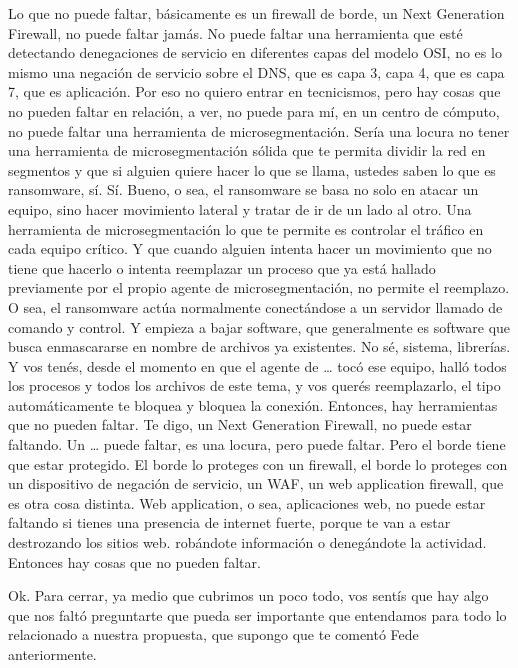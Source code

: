 \begin{description}[leftmargin=0cm, labelsep=0.5cm]
    \item[\textbf{PITA GUILLERMO:}] Lo que no puede faltar, básicamente es un firewall de borde, un Next Generation Firewall, no puede faltar jamás. No puede faltar una herramienta que esté detectando denegaciones de servicio en diferentes capas del modelo OSI, no es lo mismo una negación de servicio sobre el DNS, que es capa 3, capa 4, que es capa 7, que es aplicación. Por eso no quiero entrar en tecnicismos, pero hay cosas que no pueden faltar en relación, a ver, no puede para mí, en un centro de cómputo, no puede faltar una herramienta de microsegmentación. Sería una locura no tener una herramienta de microsegmentación sólida que te permita dividir la red en segmentos y que si alguien quiere hacer lo que se llama, ustedes saben lo que es ransomware, sí. Sí. Bueno, o sea, el ransomware se basa no solo en atacar un equipo, sino hacer movimiento lateral y tratar de ir de un lado al otro. Una herramienta de microsegmentación lo que te permite es controlar el tráfico en cada equipo crítico. Y que cuando alguien intenta hacer un movimiento que no tiene que hacerlo o intenta reemplazar un proceso que ya está hallado previamente por el propio agente de microsegmentación, no permite el reemplazo. O sea, el ransomware actúa normalmente conectándose a un servidor llamado de comando y control. Y empieza a bajar software, que generalmente es software que busca enmascararse en nombre de archivos ya existentes. No sé, sistema, librerías. Y vos tenés, desde el momento en que el agente de … tocó ese equipo, halló todos los procesos y todos los archivos de este tema, y vos querés reemplazarlo, el tipo automáticamente te bloquea y bloquea la conexión. Entonces, hay herramientas que no pueden faltar. Te digo, un Next Generation Firewall, no puede estar faltando. Un … puede faltar, es una locura, pero puede faltar. Pero el borde tiene que estar protegido. El borde lo proteges con un firewall, el borde lo proteges con un dispositivo de negación de servicio, un WAF, un web application firewall, que es otra cosa distinta. Web application, o sea, aplicaciones web, no puede estar faltando si tienes una presencia de internet fuerte, porque te van a estar destrozando los sitios web. robándote información o denegándote la actividad. Entonces hay cosas que no pueden faltar.

    \item[\textbf{MOCIULSKY SANTIAGO:}] Ok. Para cerrar, ya medio que cubrimos un poco todo, vos sentís que hay algo que nos faltó preguntarte que pueda ser importante que entendamos para todo lo relacionado a nuestra propuesta, que supongo que te comentó Fede anteriormente.


\end{description}
